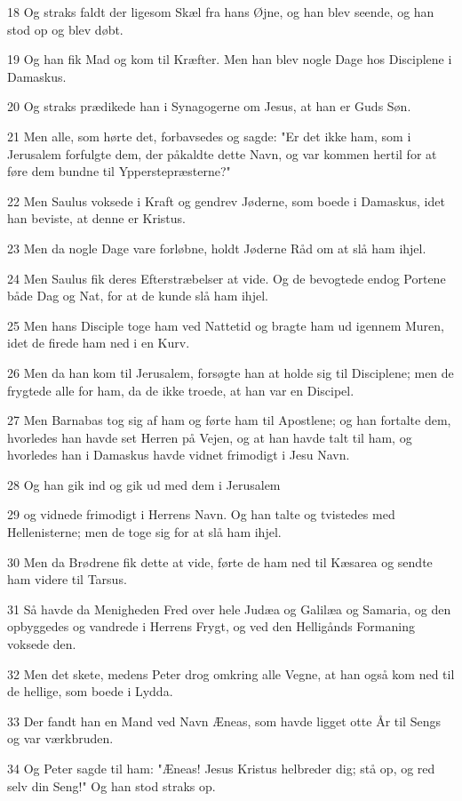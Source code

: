 \par 18 Og straks faldt der ligesom Skæl fra hans Øjne, og han blev seende, og han stod op og blev døbt.
\par 19 Og han fik Mad og kom til Kræfter. Men han blev nogle Dage hos Disciplene i Damaskus.
\par 20 Og straks prædikede han i Synagogerne om Jesus, at han er Guds Søn.
\par 21 Men alle, som hørte det, forbavsedes og sagde: "Er det ikke ham, som i Jerusalem forfulgte dem, der påkaldte dette Navn, og var kommen hertil for at føre dem bundne til Ypperstepræsterne?"
\par 22 Men Saulus voksede i Kraft og gendrev Jøderne, som boede i Damaskus, idet han beviste, at denne er Kristus.
\par 23 Men da nogle Dage vare forløbne, holdt Jøderne Råd om at slå ham ihjel.
\par 24 Men Saulus fik deres Efterstræbelser at vide. Og de bevogtede endog Portene både Dag og Nat, for at de kunde slå ham ihjel.
\par 25 Men hans Disciple toge ham ved Nattetid og bragte ham ud igennem Muren, idet de firede ham ned i en Kurv.
\par 26 Men da han kom til Jerusalem, forsøgte han at holde sig til Disciplene; men de frygtede alle for ham, da de ikke troede, at han var en Discipel.
\par 27 Men Barnabas tog sig af ham og førte ham til Apostlene; og han fortalte dem, hvorledes han havde set Herren på Vejen, og at han havde talt til ham, og hvorledes han i Damaskus havde vidnet frimodigt i Jesu Navn.
\par 28 Og han gik ind og gik ud med dem i Jerusalem
\par 29 og vidnede frimodigt i Herrens Navn. Og han talte og tvistedes med Hellenisterne; men de toge sig for at slå ham ihjel.
\par 30 Men da Brødrene fik dette at vide, førte de ham ned til Kæsarea og sendte ham videre til Tarsus.
\par 31 Så havde da Menigheden Fred over hele Judæa og Galilæa og Samaria, og den opbyggedes og vandrede i Herrens Frygt, og ved den Helligånds Formaning voksede den.
\par 32 Men det skete, medens Peter drog omkring alle Vegne, at han også kom ned til de hellige, som boede i Lydda.
\par 33 Der fandt han en Mand ved Navn Æneas, som havde ligget otte År til Sengs og var værkbruden.
\par 34 Og Peter sagde til ham: "Æneas! Jesus Kristus helbreder dig; stå op, og red selv din Seng!" Og han stod straks op.

